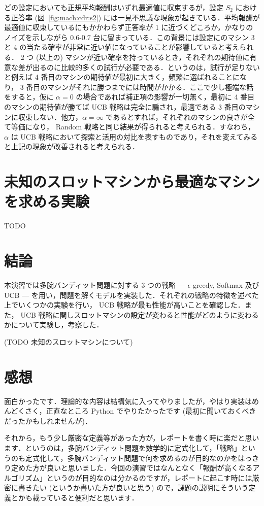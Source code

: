 \documentclass{jsarticle}
\begin{document}
どの設定においても正規平均報酬はいずれ最適値に収束するが，設定 $S_2$ における正答率 (図~\ref{fig:mach:cdr:s2}) には一見不思議な現象が起きている．平均報酬が最適値に収束しているにもかかわらず正答率が 1 に近づくどころか，かなりのノイズを示しながら $0.6$-$0.7$ 台に留まっている．この背景には設定にのマシン 3 と 4 の当たる確率が非常に近い値になっていることが影響していると考えられる． 2 つ (以上の) マシンが近い確率を持っているとき，それぞれの期待値に有意な差が出るのに比較的多くの試行が必要である．というのは，試行が足りないと例えば 4 番目のマシンの期待値が最初に大きく，頻繁に選ばれることになり， 3 番目のマシンがそれに勝つまでには時間がかかる．ここで少し極端な話をすると，仮に $\alpha = 0$ の場合であれば補正項の影響が一切無く，最初に 4 番目のマシンの期待値が勝てば UCB 戦略は完全に騙され，最適である 3 番目のマシンに収束しない．他方，$ \alpha = \infty$ であるとすれば，それぞれのマシンの良さが全て等価になり， Random 戦略と同じ結果が得られると考えられる．すなわち， $\alpha$ は UCB 戦略において探索と活用の対比を表すものであり，それを変えてみると上記の現象が改善されると考えられる．

\section{未知のスロットマシンから最適なマシンを求める実験}\label{sec:hk1}

TODO

\section{結論}\label{sec:end}

本演習では多腕バンディット問題に対する 3 つの戦略 --- $\epsilon$-greedy, Softmax 及び UCB --- を用い，問題を解くモデルを実装した．それぞれの戦略の特徴を述べた上でいくつかの実験を行い， UCB 戦略が最も性能が高いことを確認した．また， UCB 戦略に関しスロットマシンの設定が変わると性能がどのように変わるかについて実験し，考察した．

(TODO 未知のスロットマシンについて)

\section*{感想}

面白かったです．理論的な内容は結構気に入ってやりましたが，やはり実装はめんどくさく，正直なところ Python でやりたかったです (最初に聞いておくべきだったかもしれませんが)．

それから，もう少し厳密な定義等があった方が，レポートを書く時に楽だと思います．というのは，多腕バンディット問題を数学的に定式化して，「戦略」というのも定式化して，多腕バンディット問題で何を求めるのが目的なのかをはっきり定めた方が良いと思いました．今回の演習ではなんとなく「報酬が高くなるアルゴリズム」というのが目的なのは分かるのですが，レポートに起こす時には厳密に書きたい (というか書いた方が良いと思う) ので，課題の説明にそういう定義とかも載っていると便利だと思います．
\end{document}
